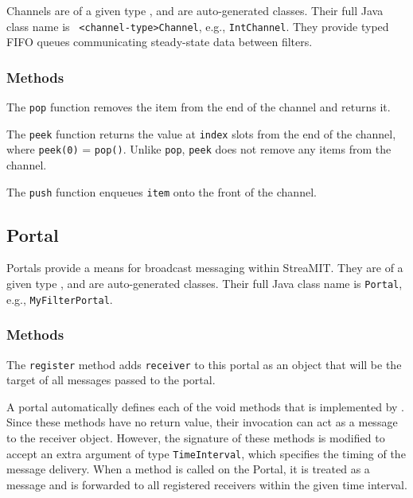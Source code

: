 Channels are of a given type {\tt <channel-type>}, and are
auto-generated classes.  Their full Java class name is {\tt
<channel-type>Channel}, e.g., {\tt IntChannel}.  They provide typed
FIFO queues communicating steady-state data between filters.

\subsubsection{Methods}

  The {\tt pop} function removes the item from the end of the channel and returns it.

  The {\tt peek} function returns the value at {\tt index} slots from the end of the channel, where {\tt peek(0)} = {\tt pop()}.  Unlike {\tt pop}, {\tt peek} does not remove any items from the channel.

  The {\tt push} function enqueues {\tt item} onto the front of the channel.

\subsection{Portal}

Portals provide a means for broadcast messaging within StreaMIT.  They
are of a given type {\tt <portal-type>}, and are auto-generated
classes.  Their full Java class name is {\tt <portal-type>Portal},
e.g., {\tt MyFilterPortal}.

\subsubsection{Methods}

  The {\tt register} method adds {\tt receiver} to this portal as an object that will be the target of all messages passed to the portal.

  A portal automatically defines each of the void methods that is implemented by {\tt <portal-type>}.  Since these methods have no return value, their invocation can act as a message to the receiver object.  However, the signature of these methods is modified to accept an extra argument of type {\tt TimeInterval}, which specifies the timing of the message delivery.  When a method is called on the Portal, it is treated as a message and is forwarded to all registered receivers within the given time interval.

